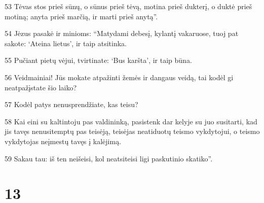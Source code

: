 \par 53 Tėvas stos prieš sūnų, o sūnus prieš tėvą, motina prieš dukterį, o duktė prieš motiną; anyta prieš marčią, ir marti prieš anytą”. 
\par 54 Jėzus pasakė ir minioms: “Matydami debesį, kylantį vakaruose, tuoj pat sakote: ‘Ateina lietus’, ir taip atsitinka. 
\par 55 Pučiant pietų vėjui, tvirtinate: ‘Bus karšta’, ir taip būna. 
\par 56 Veidmainiai! Jūs mokate atpažinti žemės ir dangaus veidą, tai kodėl gi neatpažįstate šio laiko? 
\par 57 Kodėl patys nenusprendžiate, kas teisu? 
\par 58 Kai eini su kaltintoju pas valdininką, pasistenk dar kelyje su juo susitarti, kad jis tavęs nenusitemptų pas teisėją, teisėjas neatiduotų teismo vykdytojui, o teismo vykdytojas neįmestų tavęs į kalėjimą. 
\par 59 Sakau tau: iš ten neišeisi, kol neatsiteisi ligi paskutinio skatiko”.



\chapter{13}


